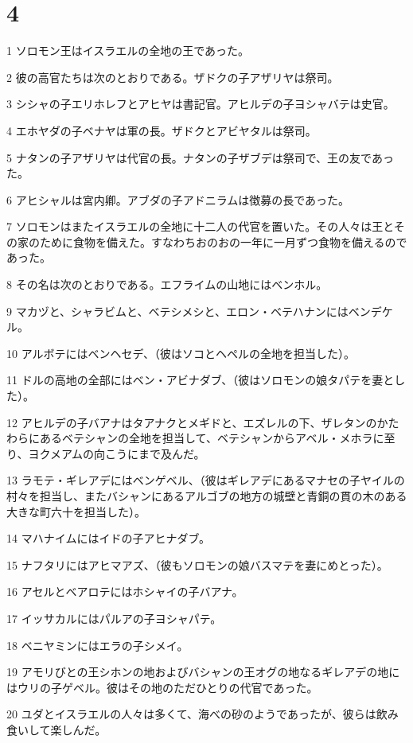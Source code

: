 \chapter{4}

\par 1 ソロモン王はイスラエルの全地の王であった。
\par 2 彼の高官たちは次のとおりである。ザドクの子アザリヤは祭司。
\par 3 シシャの子エリホレフとアヒヤは書記官。アヒルデの子ヨシャバテは史官。
\par 4 エホヤダの子ベナヤは軍の長。ザドクとアビヤタルは祭司。
\par 5 ナタンの子アザリヤは代官の長。ナタンの子ザブデは祭司で、王の友であった。
\par 6 アヒシャルは宮内卿。アブダの子アドニラムは徴募の長であった。
\par 7 ソロモンはまたイスラエルの全地に十二人の代官を置いた。その人々は王とその家のために食物を備えた。すなわちおのおの一年に一月ずつ食物を備えるのであった。
\par 8 その名は次のとおりである。エフライムの山地にはベンホル。
\par 9 マカヅと、シャラビムと、ベテシメシと、エロン・ベテハナンにはベンデケル。
\par 10 アルボテにはベンヘセデ、（彼はソコとヘペルの全地を担当した）。
\par 11 ドルの高地の全部にはベン・アビナダブ、（彼はソロモンの娘タパテを妻とした）。
\par 12 アヒルデの子バアナはタアナクとメギドと、エズレルの下、ザレタンのかたわらにあるベテシャンの全地を担当して、ベテシャンからアベル・メホラに至り、ヨクメアムの向こうにまで及んだ。
\par 13 ラモテ・ギレアデにはベンゲベル、（彼はギレアデにあるマナセの子ヤイルの村々を担当し、またバシャンにあるアルゴブの地方の城壁と青銅の貫の木のある大きな町六十を担当した）。
\par 14 マハナイムにはイドの子アヒナダブ。
\par 15 ナフタリにはアヒマアズ、（彼もソロモンの娘バスマテを妻にめとった）。
\par 16 アセルとベアロテにはホシャイの子バアナ。
\par 17 イッサカルにはパルアの子ヨシャパテ。
\par 18 ベニヤミンにはエラの子シメイ。
\par 19 アモリびとの王シホンの地およびバシャンの王オグの地なるギレアデの地にはウリの子ゲベル。彼はその地のただひとりの代官であった。
\par 20 ユダとイスラエルの人々は多くて、海べの砂のようであったが、彼らは飲み食いして楽しんだ。
